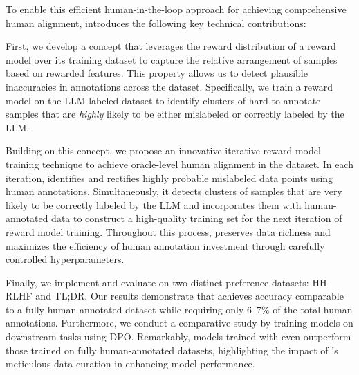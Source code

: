 To enable this efficient human-in-the-loop approach for achieving comprehensive human alignment, \myname{} introduces the following key technical contributions:

First, we develop a concept that leverages the reward distribution of a reward model over its training dataset to capture the relative arrangement of samples based on rewarded features. This property allows us to detect plausible inaccuracies in annotations across the dataset. Specifically, we train a reward model on the LLM-labeled dataset to identify clusters of hard-to-annotate samples that are \textit{highly} likely to be either mislabeled or correctly labeled by the LLM.

Building on this concept, we propose an innovative iterative reward model training technique to achieve oracle-level human alignment in the dataset. In each iteration, \myname{} identifies and rectifies highly probable mislabeled data points using human annotations. Simultaneously, it detects clusters of samples that are very likely to be correctly labeled by the LLM and incorporates them with human-annotated data to construct a high-quality training set for the next iteration of reward model training. Throughout this process, \myname{} preserves data richness and maximizes the efficiency of human annotation investment through carefully controlled hyperparameters.

Finally, we implement and evaluate \myname{} on two distinct preference datasets: HH-RLHF and TL;DR. Our results demonstrate that \myname{} achieves accuracy comparable to a fully human-annotated dataset while requiring only 6–7\% of the total human annotations. Furthermore, we conduct a comparative study by training models on downstream tasks using DPO. Remarkably, models trained with \myname{} even outperform those trained on fully human-annotated datasets, highlighting the impact of \myname{}'s meticulous data curation in enhancing model performance.



